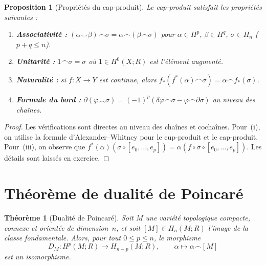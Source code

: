 \documentclass[12pt,a4paper,openany]{book}
\theoremstyle{definition}
\theoremstyle{plain}
\newtheorem{theoreme}[definition]{Théorème}
\newtheorem{proposition}[definition]{Proposition}
\theoremstyle{remark}
\begin{document}
\begin{proposition}[Propriétés du cap-produit]\label{prop:cap-proprietes}
  Le cap-produit satisfait les propriétés suivantes :
  \begin{enumerate}[label=(\roman*)]
    \item \textbf{Associativité :}
          $(\alpha \smile \beta) \frown \sigma = \alpha \frown (\beta \frown \sigma)$
          pour $\alpha \in H^p$, $\beta \in H^q$, $\sigma \in H_n$ ($p + q \leq n$).
    \item \textbf{Unitarité :} $1 \frown \sigma = \sigma$ où $1 \in H^0(X; R)$ est
          l'élément augmenté.
    \item \textbf{Naturalité :} si $f \colon X \to Y$ est continue, alors
          $f_*(f^*(\alpha) \frown \sigma) = \alpha \frown f_*(\sigma)$.
    \item \textbf{Formule du bord :}
          $\partial(\varphi \frown \sigma) = (-1)^p(\delta\varphi \frown \sigma
          - \varphi \frown \partial\sigma)$ au niveau des chaînes.
  \end{enumerate}
\end{proposition}

\begin{proof}
  Les vérifications sont directes au niveau des chaînes et cochaînes. Pour~(i),
  on utilise la formule d'Alexander--Whitney pour le cup-produit et le cap-produit.
  Pour~(iii), on observe que
  $f^*(\alpha)(\sigma \circ [e_0, \ldots, e_p]) = \alpha(f \circ \sigma \circ [e_0, \ldots, e_p])$.
  Les détails sont laissés en exercice.
\end{proof}


\section{Théorème de dualité de Poincaré}\label{sec:dualite-poincare}

\begin{theoreme}[Dualité de Poincaré]\label{thm:dualite-poincare}
  Soit $M$ une variété topologique compacte, connexe et orientée de dimension~$n$,
  et soit $[M] \in H_n(M; R)$ l'image de la classe fondamentale. Alors, pour tout
  $0 \leq p \leq n$, le morphisme
  \[
    D_M \colon H^p(M; R) \longrightarrow H_{n-p}(M; R), \qquad
    \alpha \longmapsto \alpha \frown [M]
  \]
  est un isomorphisme.
\end{theoreme}
\end{document}

